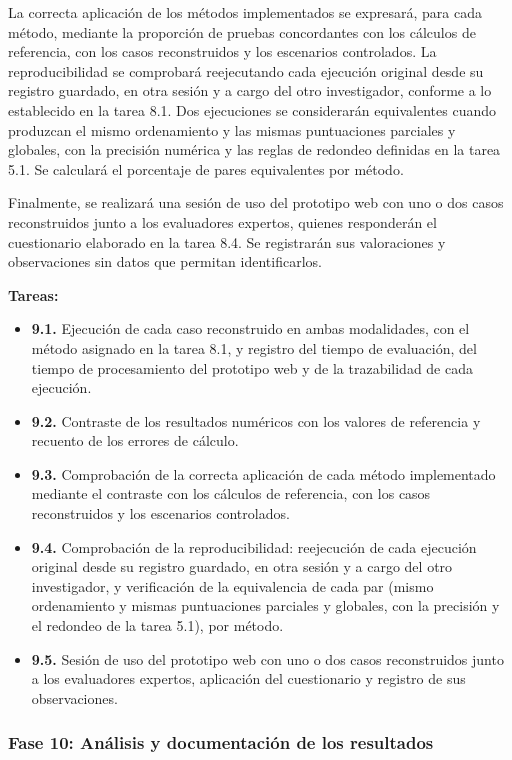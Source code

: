 \documentclass[12pt,a4paper]{article}
\begin{document}
La correcta aplicación de los métodos implementados se expresará, para cada método, mediante la proporción de pruebas concordantes con los cálculos de referencia, con los casos reconstruidos y los escenarios controlados. La reproducibilidad se comprobará reejecutando cada ejecución original desde su registro guardado, en otra sesión y a cargo del otro investigador, conforme a lo establecido en la tarea 8.1. Dos ejecuciones se considerarán equivalentes cuando produzcan el mismo ordenamiento y las mismas puntuaciones parciales y globales, con la precisión numérica y las reglas de redondeo definidas en la tarea 5.1. Se calculará el porcentaje de pares equivalentes por método.

Finalmente, se realizará una sesión de uso del prototipo web con uno o dos casos reconstruidos junto a los evaluadores expertos, quienes responderán el cuestionario elaborado en la tarea 8.4. Se registrarán sus valoraciones y observaciones sin datos que permitan identificarlos.

\textbf{Tareas:}

\begin{itemize}
\item \textbf{9.1.} Ejecución de cada caso reconstruido en ambas modalidades, con el método asignado en la tarea 8.1, y registro del tiempo de evaluación, del tiempo de procesamiento del prototipo web y de la trazabilidad de cada ejecución.
\item \textbf{9.2.} Contraste de los resultados numéricos con los valores de referencia y recuento de los errores de cálculo.
\item \textbf{9.3.} Comprobación de la correcta aplicación de cada método implementado mediante el contraste con los cálculos de referencia, con los casos reconstruidos y los escenarios controlados.
\item \textbf{9.4.} Comprobación de la reproducibilidad: reejecución de cada ejecución original desde su registro guardado, en otra sesión y a cargo del otro investigador, y verificación de la equivalencia de cada par (mismo ordenamiento y mismas puntuaciones parciales y globales, con la precisión y el redondeo de la tarea 5.1), por método.
\item \textbf{9.5.} Sesión de uso del prototipo web con uno o dos casos reconstruidos junto a los evaluadores expertos, aplicación del cuestionario y registro de sus observaciones.
\end{itemize}

\subsubsection{Fase 10: Análisis y documentación de los resultados}
\end{document}
